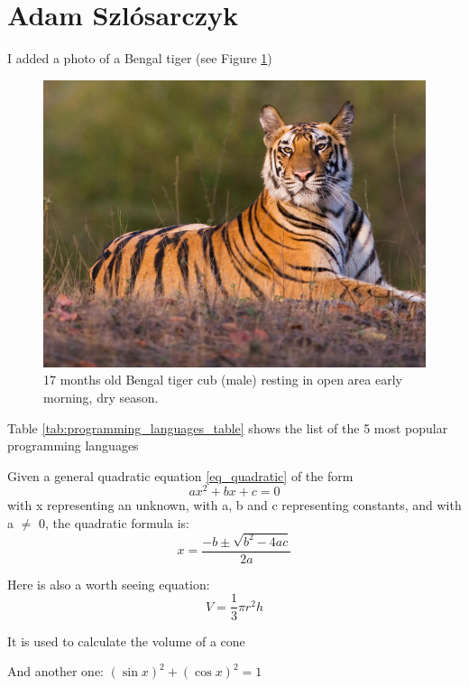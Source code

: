 \section{Adam Szlósarczyk}

I added a photo of a Bengal tiger (see Figure \ref{fig:tiger})

\begin{figure}[htbp]
    \includegraphics[width=\linewidth]{pictures/tiger.jpg}
    \caption{17 months old Bengal tiger cub (male) resting in open area early morning, dry season.}
    \label{fig:tiger}
\end{figure}

\newpage

Table \ref{tab:programming_languages_table} shows the list of the 5 most popular programming languages



Given a general quadratic equation \ref{eq_quadratic} of the form
\begin{equation} \label{eq_quadratic}
ax^2 + bx + c = 0
\end{equation}
with x representing an unknown, with a, b and c representing constants, and with a $\neq$ 0, the quadratic formula is:
\begin{equation}
x = \frac{-b \pm \sqrt{b^2 - 4ac}}{2a}
\end{equation}

Here is also a worth seeing equation: \[V=\frac{1}{3}\pi r^2h\]

It is used to calculate the volume of a cone

And another one: 
$ (\sin x)^2 + (\cos x)^2 = 1 $

